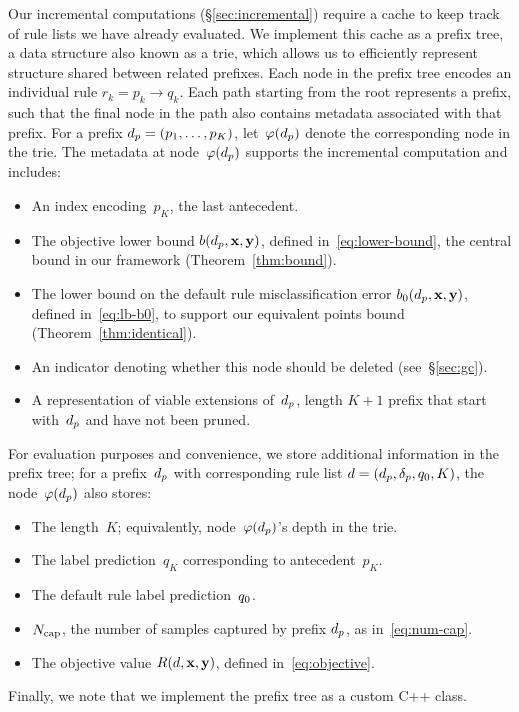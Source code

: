 Our incremental computations (\S\ref{sec:incremental}) require a
cache to keep track of rule lists we have already evaluated.
%
We implement this cache as a prefix tree, a data structure also known as a trie,
which allows us to efficiently represent structure shared between related prefixes.
%
Each node in the prefix tree encodes an individual rule ${r_k = p_k \rightarrow q_k}$.
%
Each path starting from the root represents a prefix, such that the final node
in the path also contains metadata associated with that prefix.
%
For a %
prefix ${d_p = (p_1, \dots, p_K)}$,
let~$\varphi(d_p)$ denote the corresponding node in the trie.
%
The metadata at node~$\varphi(d_p)$ supports the incremental computation
and includes:
\begin{itemize}
\item An index encoding~$p_K$, the last antecedent.
\item The objective lower bound $b(d_p, \mathbf{x}, \mathbf{y})$, defined in~\eqref{eq:lower-bound},
  the central bound in our framework (Theorem~\ref{thm:bound}).
\item The lower bound on the default rule misclassification error
  $b_0(d_p, \mathbf{x}, \mathbf{y})$, defined in~\eqref{eq:lb-b0},
  to support our equivalent points bound (Theorem~\ref{thm:identical}).
\item An indicator denoting whether this node should be deleted (see~\S\ref{sec:gc}).
\item A representation of viable extensions of~$d_p$,
  \ie length ${K+1}$ prefix that start with~$d_p$ and have not been pruned.
\end{itemize}
For evaluation purposes and convenience, we store additional information in
the prefix tree; for a prefix~$d_p$ with corresponding rule list
${{d} = (d_p, \delta_p, q_0, K)}$, the node~$\varphi(d_p)$ also stores:
\begin{itemize}
\item The length~$K$; equivalently, node~$\varphi(d_p)$'s depth in the trie. 
\item The label prediction~$q_K$ corresponding to antecedent~$p_K$.
\item The default rule label prediction~$q_0$.
\item $N_{\textnormal{cap}}$, the number of samples captured by prefix $d_p$, as in~\eqref{eq:num-cap}.
\item The objective value $R({d}, \mathbf{x}, \mathbf{y})$, defined in~\eqref{eq:objective}.
\end{itemize}
%
Finally, we note that we implement the prefix tree as a custom C++ class. %
%
%

